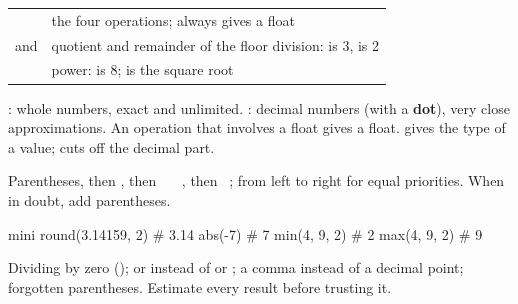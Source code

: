 \begin{essentiel}
\begin{tabularx}{\linewidth}{@{}p{28mm}Y@{}}
\py{+  -  *  /} & the four operations; \py{/} always gives a float\\
\py{//} and \py{\%} & quotient and remainder of the floor division:  is 3,
   is 2\\
\py{**} & power:  is 8;  is the square root\\
\end{tabularx}

: whole numbers, exact and unlimited. : decimal numbers (with a \textbf{dot}),
very close approximations. An operation that involves a float gives a float.  gives the
type of a value;  cuts off the decimal part.

Parentheses, then \py{**}, then \py{*}~\py{/}~\py{//}~\py{\%}, then \py{+}~\py{-}; from left to
right for equal priorities. When in doubt, add parentheses.

\begin{code}{mini}
round(3.14159, 2)   # 3.14
abs(-7)             # 7
min(4, 9, 2)        # 2
max(4, 9, 2)        # 9
\end{code}

Dividing by zero ();  or \py{\textasciicircum{}} instead of \py{*} or \py{**}; a comma
instead of a decimal point; forgotten parentheses. Estimate every result before trusting it.
\end{essentiel}

\begin{quiz}
\end{quiz}

